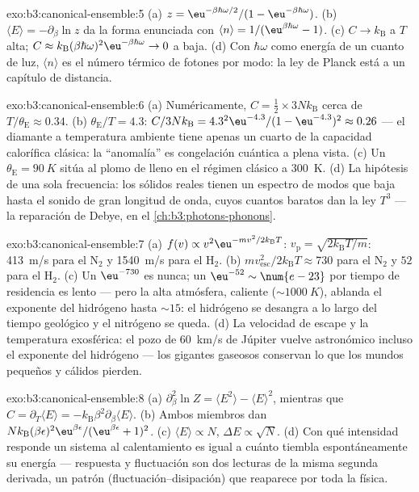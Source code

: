 \begin{solution}{exo:b3:canonical-ensemble:5}
(a) $z = \eu^{-\beta\hbar\omega/2}/(1 - \eu^{-\beta\hbar\omega})$.
(b) $\langle E\rangle = -\partial_\beta\ln z$ da la forma
enunciada con $\langle n\rangle = 1/(\eu^{\beta\hbar\omega} - 1)$. (c)
$C \to k_{\text{B}}$ a $T$ alta; $C \approx k_{\text{B}}(\beta
\hbar\omega)^2\eu^{-\beta\hbar\omega} \to 0$ a baja. (d) Con
$\hbar\omega$ como energía de un cuanto de luz, $\langle n\rangle$ es
el número térmico de fotones por modo: la ley de Planck está a un capítulo
de distancia.
\end{solution}

\begin{solution}{exo:b3:canonical-ensemble:6}
(a) Numéricamente, $C = \tfrac12 \times 3Nk_{\text{B}}$ cerca de
$T/\theta_{\text{E}} \approx 0.34$. (b) $\theta_{\text{E}}/T =
4.3$: $C/3Nk_{\text{B}} = 4.3^2\eu^{-4.3}/(1 - \eu^{-4.3})^2
\approx 0.26$ --- el diamante a temperatura ambiente tiene apenas un cuarto
de la capacidad calorífica clásica: la ``anomalía'' es congelación
cuántica a plena vista. (c) Un $\theta_{\text{E}} = \qty{90}{K}$
sitúa al plomo de lleno en el régimen clásico a \qty{300}{K}. (d) La
hipótesis de una sola frecuencia: los sólidos reales tienen un espectro de
modos que baja hasta el sonido de gran longitud de onda, cuyos cuantos
baratos dan la ley $T^3$ --- la reparación de Debye, en el
\cref{ch:b3:photons-phonons}.
\end{solution}

\begin{solution}{exo:b3:canonical-ensemble:7}
(a) $f(v) \propto v^2\eu^{-mv^2/2k_{\text{B}}T}$: $v_{\text{p}} =
\sqrt{2k_{\text{B}}T/m}$: \qty{413}{m/s} para el N$_2$ y
\qty{1540}{m/s} para el H$_2$. (b) $mv_{\text{esc}}^2/2k_{\text{B}}T
\approx 730$ para el N$_2$ y $52$ para el H$_2$. (c) Un $\eu^{-730}$ es
nunca; un $\eu^{-52} \sim \num{e-23}$ por tiempo de residencia es lento ---
pero la alta atmósfera, caliente ($\sim\qty{1000}{K}$), ablanda el
exponente del hidrógeno hasta $\sim15$: el hidrógeno se desangra a lo largo
del tiempo geológico y el nitrógeno se queda. (d) La velocidad de escape y
la temperatura exosférica: el pozo de \qty{60}{km/s} de Júpiter vuelve
astronómico incluso el exponente del hidrógeno --- los gigantes gaseosos
conservan lo que los mundos pequeños y cálidos pierden.
\end{solution}

\begin{solution}{exo:b3:canonical-ensemble:8}
(a) $\partial_\beta^2\ln Z = \langle E^2\rangle - \langle
E\rangle^2$, mientras que $C = \partial_T\langle E\rangle =
-k_{\text{B}}\beta^2\partial_\beta\langle E\rangle$. (b) Ambos
miembros dan $Nk_{\text{B}}(\beta\epsilon)^2\eu^{\beta\epsilon}/(
\eu^{\beta\epsilon} + 1)^2$. (c) $\langle E\rangle \propto N$,
$\Delta E \propto \sqrt N$. (d) Con qué intensidad responde un sistema al
calentamiento es igual a cuánto tiembla espontáneamente su energía ---
respuesta y fluctuación son dos lecturas de la misma segunda
derivada, un patrón (fluctuación--disipación) que reaparece
por toda la física.
\end{solution}

